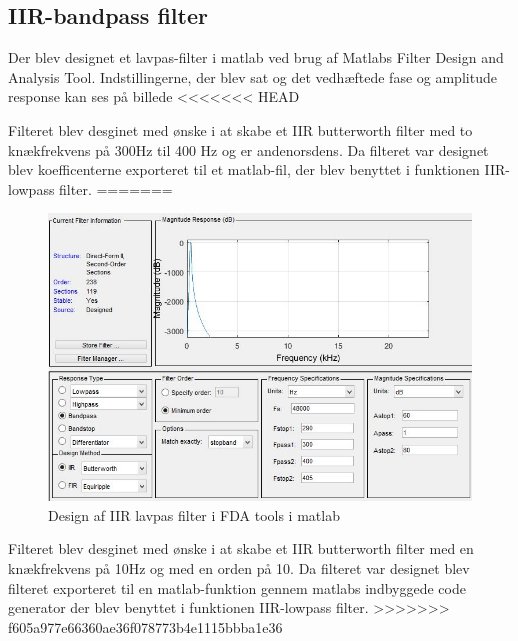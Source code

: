  
\subsection{IIR-bandpass filter}
Der blev designet et lavpas-filter i matlab ved brug af Matlabs Filter Design and Analysis Tool. Indstillingerne, der blev sat og det vedhæftede fase og amplitude response kan ses på billede 
<<<<<<< HEAD


Filteret blev desginet med ønske i at skabe et IIR butterworth filter med to knækfrekvens på 300Hz til 400 Hz og er andenorsdens. 
Da filteret var designet blev koefficenterne exporteret til et matlab-fil, der blev benyttet i funktionen IIR-lowpass filter.
=======
\begin{figure}[H]
	\centering
	\includegraphics[width=150mm]{figures/IIRlavpas.jpg}
	\caption{Design af IIR lavpas filter i FDA tools i matlab}
	\label{fig:FDAtools}
\end{figure}

Filteret blev desginet med ønske i at skabe et IIR butterworth filter med en knækfrekvens på 10Hz og med en orden på 10. 
Da filteret var designet blev filteret exporteret til en matlab-funktion gennem matlabs indbyggede code generator der blev benyttet i funktionen IIR-lowpass filter.
>>>>>>> f605a977e66360ae36f078773b4e1115bbba1e36

